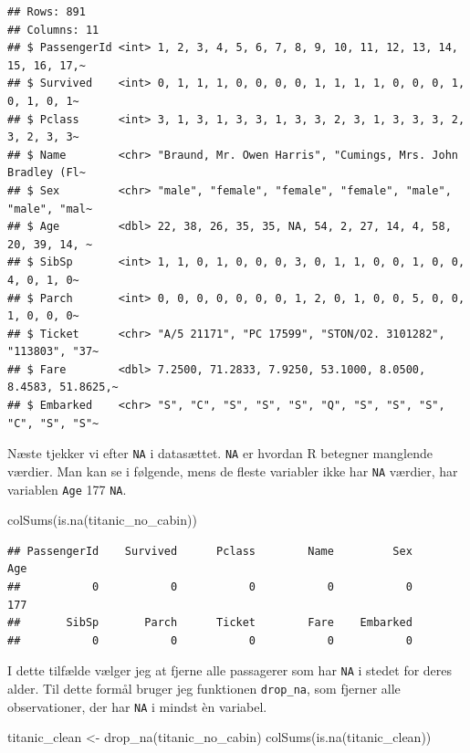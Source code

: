 \documentclass[
]{book}
\newenvironment{Shaded}{\begin{snugshade}}{\end{snugshade}}
\newcommand{\FunctionTok}[1]{\textcolor[rgb]{0.00,0.00,0.00}{#1}}
\newcommand{\NormalTok}[1]{#1}
\newcommand{\OtherTok}[1]{\textcolor[rgb]{0.56,0.35,0.01}{#1}}
\begin{document}
\begin{verbatim}
## Rows: 891
## Columns: 11
## $ PassengerId <int> 1, 2, 3, 4, 5, 6, 7, 8, 9, 10, 11, 12, 13, 14, 15, 16, 17,~
## $ Survived    <int> 0, 1, 1, 1, 0, 0, 0, 0, 1, 1, 1, 1, 0, 0, 0, 1, 0, 1, 0, 1~
## $ Pclass      <int> 3, 1, 3, 1, 3, 3, 1, 3, 3, 2, 3, 1, 3, 3, 3, 2, 3, 2, 3, 3~
## $ Name        <chr> "Braund, Mr. Owen Harris", "Cumings, Mrs. John Bradley (Fl~
## $ Sex         <chr> "male", "female", "female", "female", "male", "male", "mal~
## $ Age         <dbl> 22, 38, 26, 35, 35, NA, 54, 2, 27, 14, 4, 58, 20, 39, 14, ~
## $ SibSp       <int> 1, 1, 0, 1, 0, 0, 0, 3, 0, 1, 1, 0, 0, 1, 0, 0, 4, 0, 1, 0~
## $ Parch       <int> 0, 0, 0, 0, 0, 0, 0, 1, 2, 0, 1, 0, 0, 5, 0, 0, 1, 0, 0, 0~
## $ Ticket      <chr> "A/5 21171", "PC 17599", "STON/O2. 3101282", "113803", "37~
## $ Fare        <dbl> 7.2500, 71.2833, 7.9250, 53.1000, 8.0500, 8.4583, 51.8625,~
## $ Embarked    <chr> "S", "C", "S", "S", "S", "Q", "S", "S", "S", "C", "S", "S"~
\end{verbatim}

Næste tjekker vi efter \texttt{NA} i datasættet. \texttt{NA} er hvordan R betegner manglende værdier. Man kan se i følgende, mens de fleste variabler ikke har \texttt{NA} værdier, har variablen \texttt{Age} 177 \texttt{NA}.

\begin{Shaded}
\begin{Highlighting}[]
\FunctionTok{colSums}\NormalTok{(}\FunctionTok{is.na}\NormalTok{(titanic\_no\_cabin))}
\end{Highlighting}
\end{Shaded}

\begin{verbatim}
## PassengerId    Survived      Pclass        Name         Sex         Age 
##           0           0           0           0           0         177 
##       SibSp       Parch      Ticket        Fare    Embarked 
##           0           0           0           0           0
\end{verbatim}

I dette tilfælde vælger jeg at fjerne alle passagerer som har \texttt{NA} i stedet for deres alder. Til dette formål bruger jeg funktionen \texttt{drop\_na}, som fjerner alle observationer, der har \texttt{NA} i mindst èn variabel.

\begin{Shaded}
\begin{Highlighting}[]
\NormalTok{titanic\_clean }\OtherTok{\textless{}{-}} \FunctionTok{drop\_na}\NormalTok{(titanic\_no\_cabin)}
\FunctionTok{colSums}\NormalTok{(}\FunctionTok{is.na}\NormalTok{(titanic\_clean))}
\end{Highlighting}
\end{Shaded}
\end{document}
